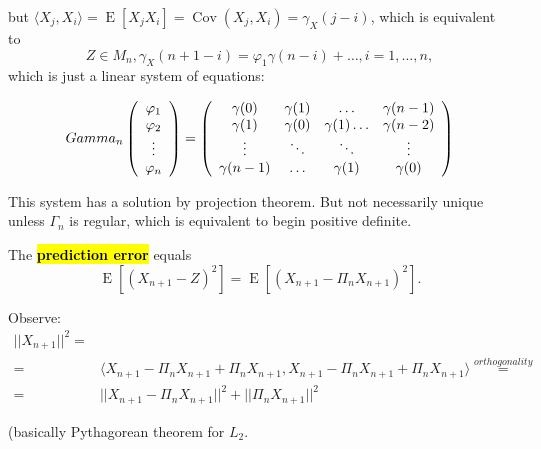 \documentclass[12pt,a4paper, notitlepage]{book}
\newcommand{\hlc}[2][yellow]{ {\sethlcolor{#1} \hl{#2}} }
\newcommand{\hlcr}[1]{\hlc[lightred]{#1}}
\theoremstyle{definition} %
\theoremstyle{plain} %
\DeclareMathOperator{\Cov}{Cov}
\DeclareMathOperator{\E}{E}
\newcommand{\New}[1]{ {\bf \hlcr{#1} } }
\begin{document}
but $\langle X_j, X_i\rangle = \E[ X_j X_i] = \Cov(X_j, X_i) = \gamma_X(j-i)$, which is equivalent to
\[ Z \in M_n, \gamma_X(n + 1 -i) = \varphi_1 \gamma(n - i) + \dots, i = 1, \dots, n , \]
 which is just a linear system of equations:

\[  Gamma_n  
\left( \begin{array}{c} \varphi _1 \\ \varphi _2 \\ \vdots \\ \varphi _n \end{array} \right)
 = 
\left( \begin{array} {c c c c} 
 \gamma(0) & \gamma(1)  & \ldots & \gamma(n-1) \\
\gamma(1) & \gamma(0) & \gamma(1) \ldots & \gamma(n-2) \\
\vdots & \ddots & \ddots & \vdots \\
\gamma(n-1) & \ldots & \gamma(1) & \gamma(0)
\end{array} \right)
\]



This system has a solution by projection theorem. But not necessarily unique unless $\Gamma_n$ is regular, which is equivalent to begin positive definite. 

The \New{ prediction error} equals 
\[  \E \left[ \left( X_{n+1} - Z \right) ^2 \right]    = \E \left[ (X_{n+1 } - \Pi_n X_{n+1})^2   \right] .  \]

Observe:
\begin{align*} ||X_{n+1}||^2  = & \\ 
= & \langle X_{n+1} - \Pi_n X_{n+1} + \Pi_n X_{n+1}, X_{n+1} - \Pi_n X_{n+1} + \Pi_n X_{n+1} \rangle \overset{orthogonality}{=}  \\
= & ||X_{n+1} - \Pi_n X_{n+1}||^2 + ||\Pi_n X_{n+1}||^2 
\end{align*}

 (basically Pythagorean theorem for $L_2 $.
\end{document}
